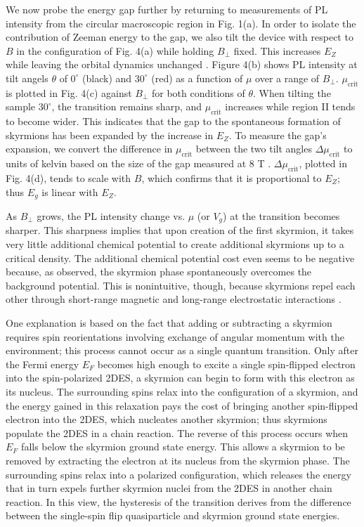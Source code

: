 \documentclass
[aps,prl,twocolumn,superscriptaddress,showpacs,floatfix]{revtex4-1}%
\begin{document}
We now probe the energy gap further by returning to measurements of PL intensity from the circular macroscopic region in Fig. 1(a). In order to isolate the contribution of Zeeman energy to the gap, we also tilt the device with respect to $B$ in the configuration of Fig. 4(a) while holding $B_{\perp}$ fixed. This increases $E_Z$ while leaving the orbital dynamics unchanged \cite{Fang}. Figure 4(b) shows PL intensity at tilt angels $\theta$ of $0^\circ$ (black) and $30^\circ$ (red) as a function of $\mu$ over a range of $B_{\perp}$. $\mu_{\text{crit}}$ is plotted in Fig. 4(c) against $B_{\perp}$ for both conditions of $\theta$. When tilting the sample $30^\circ$, the transition remains sharp, and $\mu_{\text{crit}}$ increases while region II tends to become wider. This indicates that the gap to the spontaneous formation of skyrmions has been expanded by the increase in $E_Z$. To measure the gap's expansion, we convert the difference in $\mu_{\text{crit}}$ between the two tilt angles $\Delta\mu_{\text{crit}}$ to units of kelvin based on the size of the gap measured at 8 T \cite{SI}. $\Delta\mu_{\text{crit}}$, plotted in Fig. 4(d), tends to scale with $B$, which confirms that it is proportional to $E_Z$; thus $E_g$ is linear with $E_Z$.

As $B_{\perp}$ grows, the PL intensity change vs. $\mu$ (or $V_{g}$) at the transition becomes sharper. This sharpness implies that upon creation of the first skyrmion, it takes very little additional chemical potential to create additional skyrmions up to a critical density. The additional chemical potential cost even seems to be negative because, as observed, the skyrmion phase spontaneously overcomes the background potential. This is nonintuitive, though, because skyrmions repel each other through short-range magnetic and long-range electrostatic interactions \cite{Timm}.

One explanation is based on the fact that adding or subtracting a skyrmion requires spin reorientations involving exchange of angular momentum with the environment; this process cannot occur as a single quantum transition. Only after the Fermi energy $E_F$ becomes high enough to excite a single spin-flipped electron into the spin-polarized 2DES, a skyrmion can begin to form with this electron as its nucleus. The surrounding spins relax into the configuration of a skyrmion, and the energy gained in this relaxation pays the cost of bringing another spin-flipped electron into the 2DES, which nucleates another skyrmion; thus skyrmions populate the 2DES in a chain reaction. The reverse of this process occurs when $E_F$ falls below the skyrmion ground state energy. This allows a skyrmion to be removed by extracting the electron at its nucleus from the skyrmion phase. The surrounding spins relax into a polarized configuration, which releases the energy that in turn expels further skyrmion nuclei from the 2DES in another chain reaction. In this view, the hysteresis of the transition derives from the difference between the single-spin flip quasiparticle and skyrmion ground state energies. 
\end{document}
